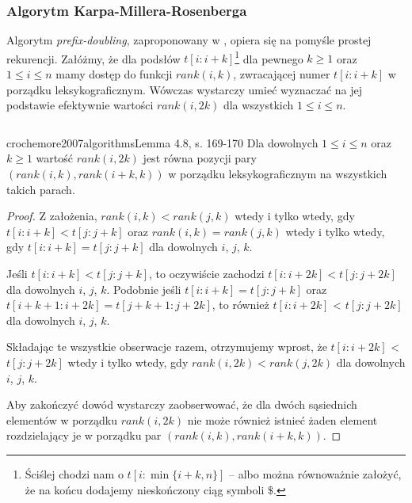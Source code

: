 \subsubsection{Algorytm Karpa-Millera-Rosenberga}

Algorytm \emph{prefix-doubling}, zaproponowany w \citep{karp1972rapid}, opiera się na pomyśle prostej rekurencji. Załóżmy, że dla podsłów $t[i:i + k]$\footnote{Ściślej chodzi nam o $t[i:\min \{i + k, n\}]$ -- albo można równoważnie założyć, że na końcu dodajemy nieskończony ciąg symboli $\$$.} dla pewnego $k \ge 1$ oraz $1 \le i \le n$ mamy dostęp do funkcji $rank(i, k)$, zwracającej numer $t[i:i + k]$ w porządku leksykograficznym.
Wówczas wystarczy umieć wyznaczać na jej podstawie efektywnie wartości $rank(i, 2k)$ dla wszystkich $1 \le i \le n$.

\begin{code}
\inputminted{python}{code/suffix-array/kmr.py}
\label{alg:suffix-array-kmr}
\end{code}

\begin{lemma}{crochemore2007algorithms}{Lemma 4.8, s. 169-170}
  Dla dowolnych $1 \le i \le n$ oraz $k \ge 1$ wartość $rank(i, 2k)$ jest równa pozycji pary $(rank(i, k), rank(i + k, k))$ w porządku leksykograficznym na wszystkich takich parach.
\end{lemma}

\begin{proof}
  Z założenia, $rank(i, k) < rank(j, k)$ wtedy i tylko wtedy, gdy $t[i: i + k] < t[j: j + k]$ oraz $rank(i, k) = rank(j, k)$ wtedy i tylko wtedy, gdy $t[i: i + k] = t[j: j + k]$ dla dowolnych $i$, $j$, $k$.

  Jeśli $t[i: i + k] < t[j: j + k]$, to oczywiście zachodzi $t[i: i + 2 k] < t[j: j + 2 k]$ dla dowolnych $i$, $j$, $k$.
  Podobnie jeśli $t[i: i + k] = t[j: j + k]$ oraz $t[i + k + 1: i + 2 k] = t[j + k + 1: j + 2 k]$, to również $t[i: i + 2 k]$ < $t[j: j + 2 k]$ dla dowolnych $i$, $j$, $k$.

  Składając te wszystkie obserwacje razem, otrzymujemy wprost, że $t[i: i + 2 k]$ < $t[j: j + 2 k]$ wtedy i tylko wtedy, gdy $rank(i, 2 k) < rank(j, 2 k)$ dla dowolnych $i$, $j$, $k$.

  Aby zakończyć dowód wystarczy zaobserwować, że dla dwóch sąsiednich elementów w porządku $rank(i, 2 k)$ nie może również istnieć żaden element rozdzielający je w porządku par $(rank(i, k), rank(i + k, k))$.
\end{proof}

